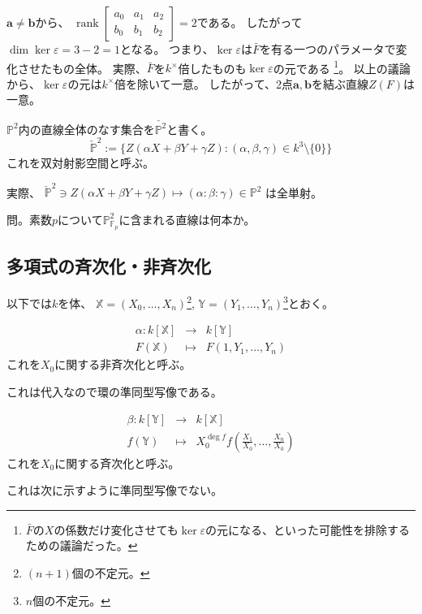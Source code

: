 \documentclass[a4]{article}
\newcommand{\proj}{\mathbb{P}}
\begin{document}
\begin{Proof}
            $\mathbf{a} \neq \mathbf{b}$から、
            $\operatorname{rank} \left[ \begin{array}{ccc} a_0 & a_1 & a_2 \\ b_0 & b_1 & b_2 \end{array} \right]=2$である。
            したがって$\dim \ker \varepsilon=3-2=1$となる。
            つまり、$\ker \varepsilon$は$\bar{F}$を有る一つのパラメータで変化させたもの全体。
            実際、$\bar{F}$を$k^{\times}$倍したものも$\ker \varepsilon$の元である
            \footnote{$\bar{F}$の$X$の係数だけ変化させても$\ker \varepsilon$の元になる、といった可能性を排除するための議論だった。}。
            以上の議論から、$\ker \varepsilon$の元は$k^{\times}$倍を除いて一意。
            したがって、2点$\mathbf{a}, \mathbf{b}$を結ぶ直線$Z(F)$は一意。
            \QED
        \end{Proof}

        \begin{Def}
            $\proj^2$内の直線全体のなす集合を$\check{\proj^2}$と書く。
            \[ \check{\proj}^2 := \{Z(\alpha X+ \beta Y+ \gamma Z) : (\alpha, \beta, \gamma) \in k^3 \setminus\{0\} \}\]
            これを双対射影空間と呼ぶ。
        \end{Def}
        実際、
        $\check{\proj}^2 \ni Z(\alpha X+ \beta Y+ \gamma Z) \mapsto (\alpha : \beta : \gamma) \in \proj^2$
        は全単射。
        
        問。素数$p$について$\proj^2_{\mathbb{F}_p}$に含まれる直線は何本か。

        \subsection{多項式の斉次化・非斉次化}
        以下では$k$を体、
        $\mathbb{X}=(X_0, \dots, X_n)$\footnote{$(n+1)$個の不定元。},
        $\mathbb{Y}=(Y_1, \dots, Y_n)$\footnote{$n$個の不定元。}とおく。

        \begin{Def}[非斉次化]
        \begin{eqnarray*}
            \alpha :
                k[\mathbb{X}] &\to& k[\mathbb{Y}]\\
                F(\mathbb{X}) &\mapsto& F(1, Y_1, \dots, Y_n)
        \end{eqnarray*}
        これを$X_0$に関する非斉次化と呼ぶ。
        \end{Def}
        これは代入なので環の準同型写像である。

        \begin{Def}[斉次化]
        \begin{eqnarray*}
            \beta :
                k[\mathbb{Y}] &\to& k[\mathbb{X}] \\
                f(\mathbb{Y}) &\mapsto& X_0^{\deg f} f \left( \frac{X_1}{X_0}, \dots, \frac{X_n}{X_0} \right)
        \end{eqnarray*}
        これを$X_0$に関する斉次化と呼ぶ。
        \end{Def}
        これは次に示すように準同型写像でない。
\end{document}
